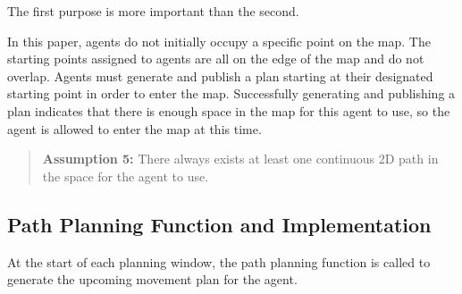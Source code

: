 The first purpose is more important than the second.

In this paper, agents do not initially occupy a specific point on the map. The starting points assigned to agents are all on the edge of the map and do not overlap. Agents must generate and publish a plan starting at their designated starting point in order to enter the map.
Successfully generating and publishing a plan indicates that there is enough space in the map for this agent to use, so the agent is allowed to enter the map at this time.

\begin{quotation}
    \textbf{Assumption 5:}
    There always exists at least one continuous 2D path in the space for the agent to use.
\end{quotation}

\subsection{Path Planning Function and Implementation}

At the start of each planning window, the path planning function is called to generate the upcoming movement plan for the agent.

